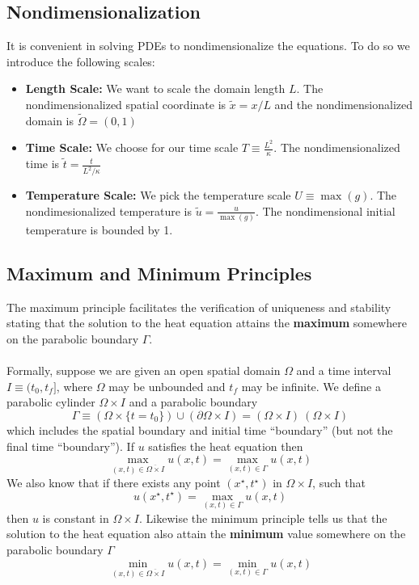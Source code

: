 \documentclass[11pt]{article}
\begin{document}
\subsection{Nondimensionalization}
It is convenient in solving PDEs to nondimensionalize the equations. To do so we introduce the following scales:
\begin{itemize}
\item \textbf{Length Scale:} We want to scale the domain length $L$. The nondimensionalized spatial coordinate is $\tilde{x} = x/L$ and the nondimensionalized domain is $\tilde{\Omega}  = (0, 1)$

\item \textbf{Time Scale:} We choose for our time scale $T \equiv \frac{L^2}{\kappa}$. The nondimensionalized time is $\tilde{t} = \frac{t}{L^2/\kappa}$
\item \textbf{Temperature Scale:} We pick the temperature scale $U \equiv \max(g)$. The nondimesionalized temperature is $\tilde{u}  = \frac{u}{\max(g)}$. The nondimensional initial temperature is bounded by 1.

\end{itemize}

\subsection{Maximum and Minimum Principles}
The maximum principle facilitates the verification of uniqueness and stability stating that the solution to the heat equation attains the \textbf{maximum} somewhere on the parabolic boundary $\Gamma$. \\ \\
Formally, suppose we are given an open spatial domain $\Omega$ and a time interval $I \equiv (t_0, t_f ]$, where $\Omega$ may be unbounded and $t_f$ may be infinite. We define a parabolic cylinder $\Omega \times I$ and a parabolic boundary 
$$ \Gamma \equiv (\Omega \times \{t = t_0 \}) \cup (\partial \Omega \times I) = (\Omega \times I) \ (\Omega \times I)$$which includes the spatial boundary and initial time “boundary” (but not the final time “boundary”). If $u$ satisfies the heat equation then
$$ \max_{(x,t) \in \overline{\Omega \times I}} u(x, t) = \max_{(x,t) \in \Gamma} u(x, t)$$
We also know that if there exists any point $(x^{\star}, t^{\star})$ in $\Omega \times I$,  such that $$ u(x^{\star}, t^{\star}) = \max_{(x,t) \in \Gamma} u(x, t)$$
then $u$ is constant in $\Omega \times I$. Likewise the minimum principle tells us that the solution to the heat equation also attain the \textbf{minimum} value somewhere on the parabolic boundary $\Gamma$
$$ \min_{(x,t) \in \overline{\Omega \times I}} u(x, t) = \min_{(x,t) \in \Gamma} u(x, t)$$
\end{document}
